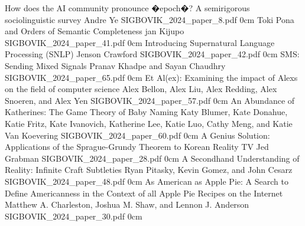 	{How does the AI community pronounce �epoch�? A semirigorous sociolinguistic survey}
	{Andre Ye}
	{}
	{SIGBOVIK_2024_paper_8.pdf}
	{0cm}
	{}
\addpaper
	{Toki Pona and Orders of Semantic Completeness}
	{jan Kijupo}
	{}
	{SIGBOVIK_2024_paper_41.pdf}
	{0cm}
	{}
\addpaper
	{Introducing Supernatural Language Processing (SNLP)}
	{Jenson Crawford}
	{}
	{SIGBOVIK_2024_paper_42.pdf}
	{0cm}
	{}
\addpaper
	{SMS: Sending Mixed Signals}
	{Pranav Khadpe and Sayan Chaudhry}
	{}
	{SIGBOVIK_2024_paper_65.pdf}
	{0cm}
	{}
\addpaper
	{Et Al(ex): Examining the impact of Alexs on the field of computer science}
	{Alex Bellon, Alex Liu, Alex Redding, Alex Snoeren, and Alex Yen}
	{}
	{SIGBOVIK_2024_paper_57.pdf}
	{0cm}
	{}
\addpaper
	{An Abundance of Katherines: The Game Theory of Baby Naming}
	{Katy Blumer, Kate Donahue, Katie Fritz, Kate Ivanovich, Katherine Lee, Katie Luo, Cathy Meng, and Katie Van Koevering}
	{}
	{SIGBOVIK_2024_paper_60.pdf}
	{0cm}
	{}
\addpaper
	{A Genius Solution: Applications of the Sprague-Grundy Theorem to Korean Reality TV}
	{Jed Grabman}
	{}
	{SIGBOVIK_2024_paper_28.pdf}
	{0cm}
	{}
\addpaper
	{A Secondhand Understanding of Reality: Infinite Craft Subtleties}
	{Ryan Pitasky, Kevin Gomez, and John Cesarz}
	{}
	{SIGBOVIK_2024_paper_48.pdf}
	{0cm}
	{}
\addpaper
	{As American as Apple Pie: A Search to Define Americanness in the Context of all Apple Pie Recipes on the Internet}
	{Matthew A. Charleston, Joshua M. Shaw, and Lennon J. Anderson}
	{}
	{SIGBOVIK_2024_paper_30.pdf}
	{0cm}
	{}
